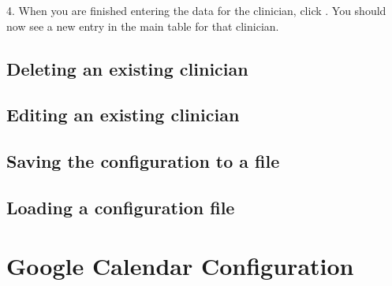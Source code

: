 \documentclass[letterpaper,10pt,english]{sphinxmanual}
\begin{document}
\begin{figure}[htbp]
\centering
{}\end{figure}

\begin{DUlineblock}{0em}
\item[] 
\end{DUlineblock}

4. When you are finished entering the data for the clinician, click .
You should now see a new entry in the main table for that clinician.

\begin{figure}[htbp]
\centering
{}\end{figure}

\begin{DUlineblock}{0em}
\item[] 
\end{DUlineblock}


\subsection{Deleting an existing clinician}
\label{\detokenize{index:deleting-an-existing-clinician}}

\subsection{Editing an existing clinician}
\label{\detokenize{index:editing-an-existing-clinician}}

\subsection{Saving the configuration to a file}
\label{\detokenize{index:saving-the-configuration-to-a-file}}

\subsection{Loading a configuration file}
\label{\detokenize{index:loading-a-configuration-file}}

\section{Google Calendar Configuration}
\label{\detokenize{index:google-calendar-configuration}}
\end{document}
